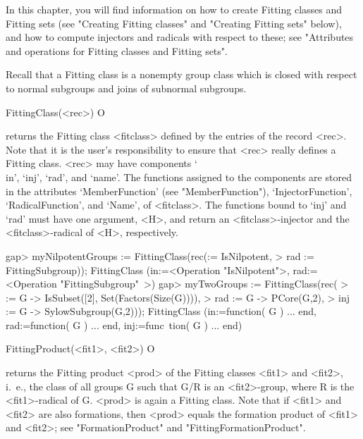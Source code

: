 
In this chapter, you will find information on how to create 
Fitting classes and Fitting sets (see "Creating Fitting classes" and
"Creating Fitting sets" below), and how to compute injectors and radicals
with respect to these;  see "Attributes and operations for Fitting classes
and Fitting sets".



Recall that a Fitting class is a nonempty group class which is closed with respect
to normal subgroups and joins of subnormal subgroups.

\>FittingClass(<rec>) O

returns the Fitting class <fitclass> defined by the entries of the record
<rec>. Note that it is the user's responsibility to ensure that <rec> really
defines a Fitting class.
<rec> may have components `\\in', `inj', `rad', and `name'. The
functions assigned to the components are stored in the attributes
`MemberFunction' (see "MemberFunction"), `InjectorFunction',
`RadicalFunction', and `Name', of <fitclass>. The functions bound to `inj' and
`rad' must have one argument, <H>, and return an <fitclass>-injector and the
<fitclass>-radical of <H>, respectively.


\beginexample
gap> myNilpotentGroups := FittingClass(rec(\in := IsNilpotent,
>    rad := FittingSubgroup));
FittingClass (in:=<Operation "IsNilpotent">, rad:=<Operation "FittingSubgroup"\
>)
gap> myTwoGroups := FittingClass(rec(
>    \in := G -> IsSubset([2], Set(Factors(Size(G)))), 
>    rad :=  G -> PCore(G,2),
>    inj := G -> SylowSubgroup(G,2)));
FittingClass (in:=function( G ) ... end, rad:=function( G ) ... end, inj:=func\
tion( G ) ... end)
\endexample

\>FittingProduct(<fit1>, <fit2>) O

returns the Fitting product <prod> of the Fitting classes <fit1> and <fit2>,
i.~e., the class of all groups G such that G/R is  an <fit2>-group, where R
is the <fit1>-radical of G.  <prod> is again a Fitting class.
Note that if <fit1> and <fit2> are also
formations, then <prod> equals the
formation product of <fit1> and <fit2>; see "FormationProduct" 
and
"FittingFormationProduct".

